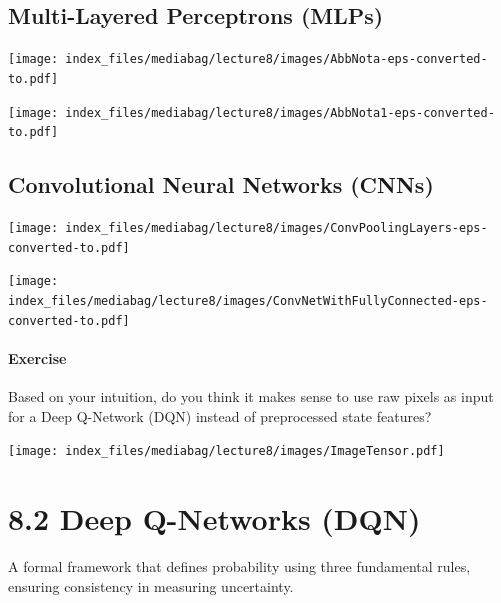 \documentclass[
  letterpaper,
  DIV=11,
  numbers=noendperiod]{scrreprt}
\begin{document}
\section{Multi-Layered Perceptrons
(MLPs)}\label{multi-layered-perceptrons-mlps}

\texttt{[image: index\_files/mediabag/lecture8/images/AbbNota-eps-converted-to.pdf]}

\texttt{[image: index\_files/mediabag/lecture8/images/AbbNota1-eps-converted-to.pdf]}

\section{Convolutional Neural Networks
(CNNs)}\label{convolutional-neural-networks-cnns}

\texttt{[image: index\_files/mediabag/lecture8/images/ConvPoolingLayers-eps-converted-to.pdf]}

\texttt{[image: index\_files/mediabag/lecture8/images/ConvNetWithFullyConnected-eps-converted-to.pdf]}

\subsubsection{\texorpdfstring{ Exercise
}{ Exercise }}\label{exercise-13}

Based on your intuition, do you think it makes sense to use raw pixels
as input for a Deep Q-Network (DQN) instead of preprocessed state
features?

\texttt{[image: index\_files/mediabag/lecture8/images/ImageTensor.pdf]}

\begin{tcolorbox}[enhanced jigsaw, opacityback=0, left=2mm, breakable, bottomtitle=1mm, rightrule=.15mm, colframe=quarto-callout-tip-color-frame, titlerule=0mm, colback=white, opacitybacktitle=0.6, toptitle=1mm, title=\textcolor{quarto-callout-tip-color}{\faLightbulb}\hspace{0.5em}{Solution}, colbacktitle=quarto-callout-tip-color!10!white, bottomrule=.15mm, arc=.35mm, coltitle=black, leftrule=.75mm, toprule=.15mm]

\end{tcolorbox}

\chapter{8.2 Deep Q-Networks (DQN)}\label{deep-q-networks-dqn}

\begin{tcolorbox}[enhanced jigsaw, colback=white, left=2mm, breakable, opacityback=0, bottomrule=.15mm, rightrule=.15mm, arc=.35mm, colframe=quarto-callout-note-color-frame, leftrule=.75mm, toprule=.15mm]

A formal framework that defines probability using three fundamental
rules, ensuring consistency in measuring uncertainty. 🎲

\end{tcolorbox}
\end{document}
